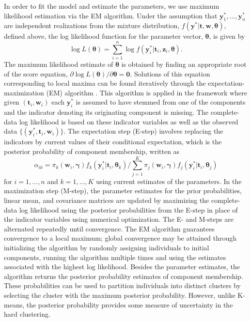 \documentclass[12pt]{article}
\newcommand{\B}[0]{\mathbf}
\newcommand{\bs}[0]{\boldsymbol}
\begin{document}
In order to fit the model and estimate the parameters, we use maximum likelihood estimation via the EM algorithm. Under the assumption that $\B y^{*}_{1},...,\B y^{*}_{n}$ are independent realizations from the mixture distribution, $f(\B y^{*} | \B t, \B w, \bs\theta)$, defined above, the log likelihood function for the parameter vector, $\bs \theta$, is given by
$$\log L(\bs\theta)=\sum^{n}_{i=1}\log f(\B y^{*}_{i}|\B t_{i},\B z_{i},\bs \theta).$$
The maximum likelihood estimate of $\bs\theta$ is obtained by finding an appropriate root of the score equation, $\partial \log L(\bs\theta)/\partial \bs\theta=\B 0.$ Solutions of this equation corresponding to local maxima can be found iteratively through the expectation-maximization (EM) algorithm \cite{dempster1977}. This algorithm is applied in the framework where given $(\B t_{i},\B w_{i})$ each $\B y^{*}_{i}$ is assumed to have stemmed from one of the components and the indicator denoting its originating component is missing. The complete-data log likelihood is based on these indicator variables as well as the observed data $\{(\B y^{*}_{i}, \B t_{i}, \B w_{i})\}$. The expectation step (E-step) involves replacing the indicators by current values of their conditional expectation, which is the posterior probability of component membership, written as
$$\alpha_{ik}=\pi_{k}(\B w_{i},\bs\gamma)f_{k}(\B y^{*}_{i}|\B t_{i},\bs\theta_{k})/\sum_{j=1}^{K}\pi_{j}(\B w_{i},\bs\gamma)f_{j}(\B y^{*}_{i}|\B t_{i},\bs \theta_{j})$$
for $i=1,...,n$ and $k=1,...,K$ using current estimates of the parameters. In the maximization step (M-step), the parameter estimates for the prior probabilities, linear mean, and covariance matrices are updated by maximizing the complete-data log likelihood using the posterior probabilities from the E-step in place of the indicator variables using numerical optimization. The E- and M-steps are alternated repeatedly until convergence. The EM algorithm guarantees convergence to a local maximum; global convergence may be attained through initializing the algorithm by randomly assigning individuals to initial components, running the algorithm multiple times and using the estimates associated with the highest log likelihood. Besides the parameter estimates, the algorithm returns the posterior probability estimates of component membership. These probabilities can be used to partition individuals into distinct clusters by selecting the cluster with the maximum posterior probability. However, unlike K-means, the posterior probability provides some measure of uncertainty in the hard clustering. 
\end{document}
